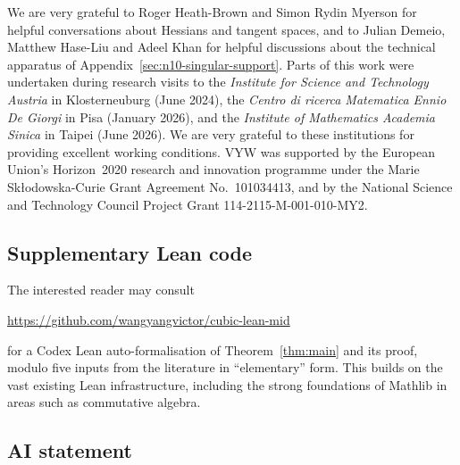 \documentclass[a4paper,11pt, twoside,reqno]{amsart}
\theoremstyle{plain}
\theoremstyle{definition}
\theoremstyle{remark}
\numberwithin{equation}{section}
\begin{document}
We are very grateful to
Roger Heath-Brown and 
Simon Rydin Myerson 
for helpful conversations about 
Hessians and 
tangent spaces,
and to Julian Demeio,
Matthew Hase-Liu and
Adeel Khan
for helpful discussions about
the technical apparatus of Appendix~\ref{sec:n10-singular-support}.
Parts of this work were undertaken during research visits 
to the {\em Institute for Science and Technology Austria} in Klosterneuburg (June 2024), 
 the {\em Centro di ricerca Matematica Ennio De Giorgi} in Pisa (January 2026), and 
the {\em Institute of Mathematics Academia Sinica}
in Taipei (June 2026). 
We are very grateful to these institutions for providing excellent working conditions. 
VYW was supported by
the European Union's Horizon~2020 research and innovation programme under the Marie Sk\l{}odowska-Curie Grant Agreement No.~101034413,
and by the National Science and Technology Council Project Grant 114-2115-M-001-010-MY2.

\subsection*{Supplementary Lean code}

The interested reader may consult
\begin{center}
\url{https://github.com/wangyangvictor/cubic-lean-mid}
\end{center}
for a Codex Lean auto-formalisation of Theorem~\ref{thm:main} and its proof,
modulo five inputs from the literature
 in ``elementary'' form.
This builds on the vast existing Lean infrastructure,
including the strong foundations of Mathlib in areas such as commutative algebra.

\subsection*{AI statement}
\end{document}
